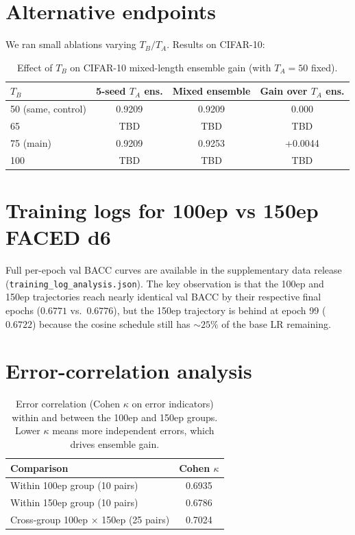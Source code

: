 \section{Alternative endpoints}
\label{sup:endpoints}

We ran small ablations varying $T_B/T_A$. Results on CIFAR-10:

\begin{table}[h]
\centering
\caption{Effect of $T_B$ on CIFAR-10 mixed-length ensemble gain (with
$T_A=50$ fixed).}
\label{tab:endpoint_ablation}
\begin{tabular}{lccc}
\toprule
$T_B$ & 5-seed $T_A$ ens. & Mixed ensemble & Gain over $T_A$ ens. \\
\midrule
50 (same, control) & 0.9209 & 0.9209 & 0.000 \\
65  & TBD & TBD & TBD \\
75 (main)  & 0.9209 & 0.9253 & +0.0044 \\
100 & TBD & TBD & TBD \\
\bottomrule
\end{tabular}
\end{table}

\section{Training logs for 100ep vs 150ep FACED d6}
\label{sup:training_logs}

Full per-epoch val BACC curves are available in the supplementary data
release (\texttt{training\_log\_analysis.json}). The key observation is
that the 100ep and 150ep trajectories reach nearly identical val BACC by
their respective final epochs ($0.6771$ vs.\ $0.6776$), but the 150ep
trajectory is behind at epoch 99 ($0.6722$) because the cosine schedule
still has $\sim\!25\%$ of the base LR remaining.

\section{Error-correlation analysis}
\label{sup:correlation}

\begin{table}[h]
\centering
\caption{Error correlation (Cohen $\kappa$ on error indicators) within and
between the 100ep and 150ep groups. Lower $\kappa$ means more independent
errors, which drives ensemble gain.}
\label{tab:error_kappa}
\begin{tabular}{lc}
\toprule
Comparison & Cohen $\kappa$ \\
\midrule
Within 100ep group (10 pairs) & 0.6935 \\
Within 150ep group (10 pairs) & 0.6786 \\
Cross-group 100ep $\times$ 150ep (25 pairs) & 0.7024 \\
\bottomrule
\end{tabular}
\end{table}
